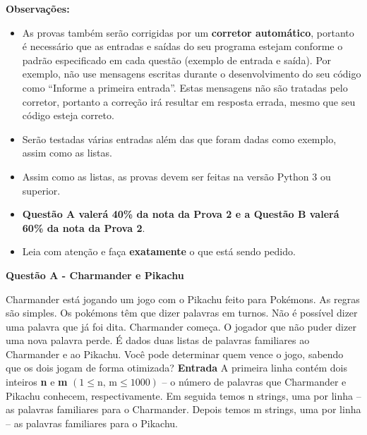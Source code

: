 \documentclass[a4paper, 12pt]{article}
\begin{document}
\textbf{{\large Observações:}}
\begin{itemize}
	\item As provas também serão corrigidas por um \textbf{corretor automático}, portanto é necessário que as entradas e saídas do seu programa estejam conforme o padrão especificado em cada questão (exemplo de entrada e saída). Por exemplo, não use mensagens escritas durante o desenvolvimento do seu código como “Informe a primeira entrada”. Estas mensagens não são tratadas pelo corretor, portanto a correção irá resultar em resposta errada, mesmo que seu código esteja correto.
	\item Serão testadas várias entradas além das que foram dadas como exemplo, assim como as listas.
	\item Assim como as listas, as provas devem ser feitas na versão Python 3 ou superior.
	\item \textbf{Questão A valerá 40\% da nota da Prova 2 e a Questão B valerá 60\% da nota da Prova 2}.
	\item Leia com atenção e faça \textbf{exatamente} o que está sendo pedido.
\end{itemize}
\newpage %
\begin{center}
\textbf{{\Large Questão A - Charmander e Pikachu}}
\end{center}
\vspace{5pt}
Charmander está jogando um jogo com o Pikachu feito para Pokémons. As regras são simples. Os pokémons têm que dizer palavras em turnos. Não é possível dizer uma palavra que já foi dita. Charmander começa. O jogador que não puder dizer uma nova palavra perde. \newline \newline
É dados duas listas de palavras familiares ao Charmander e ao Pikachu. Você pode determinar quem vence o jogo, sabendo que os dois jogam de forma otimizada?
\newline \newline
\textbf{{\large Entrada}} \newline
A primeira linha contém dois inteiros \textbf{n} e \textbf{m} $\left( 1\leq\textrm{n, m} \leq 1000 \right)$ – o número de palavras que Charmander e Pikachu conhecem, respectivamente. \newline
Em seguida temos n strings, uma por linha – as palavras familiares para o Charmander. \newline
Depois temos m strings, uma por linha – as palavras familiares para o Pikachu. \newline
\end{document}
